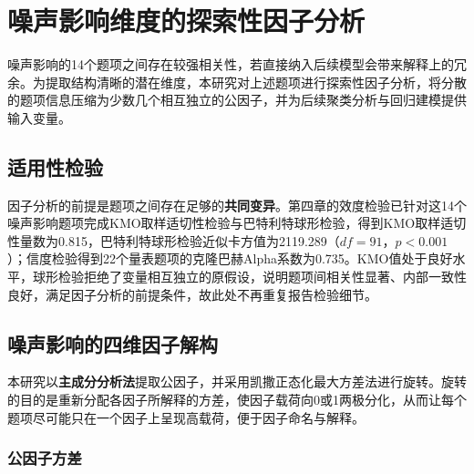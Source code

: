 \section{噪声影响维度的探索性因子分析}

噪声影响的14个题项之间存在较强相关性，若直接纳入后续模型会带来解释上的冗余。为提取结构清晰的潜在维度，本研究对上述题项进行探索性因子分析，将分散的题项信息压缩为少数几个相互独立的公因子，并为后续聚类分析与回归建模提供输入变量。

\subsection{适用性检验}

因子分析的前提是题项之间存在足够的\textbf{共同变异}。第四章的效度检验已针对这14个噪声影响题项完成KMO取样适切性检验与巴特利特球形检验，得到KMO取样适切性量数为0.815，巴特利特球形检验近似卡方值为2119.289（$df=91$，$p<0.001$）；信度检验得到22个量表题项的克隆巴赫Alpha系数为0.735。KMO值处于良好水平，球形检验拒绝了变量相互独立的原假设，说明题项间相关性显著、内部一致性良好，满足因子分析的前提条件，故此处不再重复报告检验细节。

\subsection{噪声影响的四维因子解构}

本研究以\textbf{主成分分析法}提取公因子，并采用凯撒正态化最大方差法进行旋转。旋转的目的是重新分配各因子所解释的方差，使因子载荷向0或1两极分化，从而让每个题项尽可能只在一个因子上呈现高载荷，便于因子命名与解释。

\subsubsection{公因子方差}

